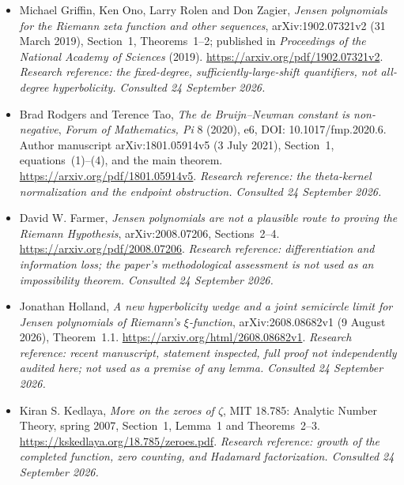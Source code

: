 \documentclass[11pt]{article}
\begin{document}
\begin{itemize}
\item[\textnormal{[E3]}]\hypertarget{extra:2:3}{} Michael Griffin, Ken Ono,
Larry Rolen and Don Zagier,
\emph{Jensen polynomials for the Riemann zeta function and other sequences},
arXiv:1902.07321v2 (31 March 2019), Section~1, Theorems~1--2;
published in \emph{Proceedings of the National Academy of Sciences} (2019).
\url{https://arxiv.org/pdf/1902.07321v2}.
{\small\textit{Research reference: the fixed-degree, sufficiently-large-shift
quantifiers, not all-degree hyperbolicity. Consulted 24 September 2026.}}

\item[\textnormal{[E4]}]\hypertarget{extra:2:4}{} Brad Rodgers and Terence Tao,
\emph{The de Bruijn--Newman constant is non-negative},
\emph{Forum of Mathematics, Pi} 8 (2020), e6,
DOI: 10.1017/fmp.2020.6.
Author manuscript arXiv:1801.05914v5 (3 July 2021),
Section~1, equations~(1)--(4), and the main theorem.
\url{https://arxiv.org/pdf/1801.05914v5}.
{\small\textit{Research reference: the theta-kernel normalization and the
endpoint obstruction. Consulted 24 September 2026.}}

\item[\textnormal{[E5]}]\hypertarget{extra:2:5}{} David W. Farmer,
\emph{Jensen polynomials are not a plausible route to proving the Riemann
Hypothesis}, arXiv:2008.07206, Sections~2--4.
\url{https://arxiv.org/pdf/2008.07206}.
{\small\textit{Research reference: differentiation and information loss;
the paper's methodological assessment is not used as an impossibility theorem.
Consulted 24 September 2026.}}

\item[\textnormal{[E6]}]\hypertarget{extra:2:6}{} Jonathan Holland,
\emph{A new hyperbolicity wedge and a joint semicircle limit for Jensen
polynomials of Riemann's $\xi$-function},
arXiv:2608.08682v1 (9 August 2026), Theorem~1.1.
\url{https://arxiv.org/html/2608.08682v1}.
{\small\textit{Research reference: recent manuscript, statement inspected,
full proof not independently audited here; not used as a premise of any lemma.
Consulted 24 September 2026.}}

\item[\textnormal{[E7]}]\hypertarget{extra:2:7}{} Kiran S. Kedlaya,
\emph{More on the zeroes of $\zeta$}, MIT 18.785: Analytic Number Theory,
spring 2007, Section~1, Lemma~1 and Theorems~2--3.
\url{https://kskedlaya.org/18.785/zeroes.pdf}.
{\small\textit{Research reference: growth of the completed function, zero
counting, and Hadamard factorization. Consulted 24 September 2026.}}


\end{itemize}
\end{document}
